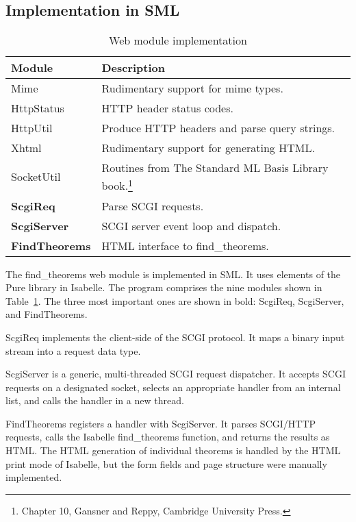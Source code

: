 \documentclass[a4paper,draft]{article} %
\newcommand{\reftab}[1]{Table~\ref{tab:#1}}
\begin{document}
\subsection{Implementation in \acs{SML}}\label{sec:oneproc:impl}

\begin{table}
\begin{tabular}{lp{}}
\textbf{Module}	     &	\textbf{Description}\\\hline
Mime		     &	Rudimentary support for mime types.\\
HttpStatus	     &	\ac{HTTP} header status codes.\\
HttpUtil	     &	Produce \ac{HTTP} headers and parse query strings.\\
Xhtml		     &	Rudimentary support for generating \ac{HTML}.\\
SocketUtil	     &	Routines from The Standard ML Basis Library
			book.\footnote{Chapter 10, Gansner and Reppy, 
			Cambridge University Press.}\\
\textbf{ScgiReq}     &	Parse \ac{SCGI} requests.\\
\textbf{ScgiServer}  &	\ac{SCGI} server event loop and dispatch.\\
\textbf{FindTheorems}&	\ac{HTML} interface to find\_theorems.
\end{tabular}
\caption{Web module implementation\label{tab:moduleimpl}}
\end{table}

The find\_theorems web module is implemented in \ac{SML}.
It uses elements of the Pure library in Isabelle.
The program comprises the nine modules shown in \reftab{moduleimpl}.
The three most important ones are shown in bold: ScgiReq, ScgiServer, and 
FindTheorems.

ScgiReq implements the client-side of the \ac{SCGI} protocol.
It maps a binary input stream into a request data type.

ScgiServer is a generic, multi-threaded \ac{SCGI} request dispatcher.
It accepts \ac{SCGI} requests on a designated socket, selects an appropriate 
handler from an internal list, and calls the handler in a new thread.

FindTheorems registers a handler with ScgiServer.
It parses \ac{SCGI}/\ac{HTTP} requests, calls the Isabelle find\_theorems 
function, and returns the results as \ac{HTML}.
The \ac{HTML} generation of individual theorems is handled by the \ac{HTML} 
print mode of Isabelle, but the form fields and page structure were manually 
implemented.
\end{document}

